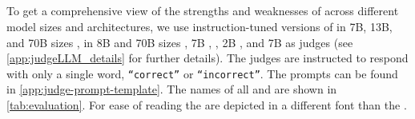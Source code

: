 


 

\subsection{\Judgemodels} \label{sec:experiments:judgellm}
To get a comprehensive view of the strengths and weaknesses of \judgemodels across different model sizes and architectures, we use instruction-tuned versions of  in 7B, 13B, and 70B sizes \citep{touvron2023llama},  in 8B and 70B sizes \citep{meta2024llama3},  7B \citep{jiang2023mistral},  \citep{openai2024gpt4},  2B \citep{gemma2024gemma}, and  7B \citep{judgelm} as judges (see  \cref{app:judgeLLM_details} for further details).
%
The judges are instructed to respond with only a single word,  \texttt{``correct''} or \texttt{``incorrect''}. %
The prompts can be found in \cref{app:judge-prompt-template}. The names of all \evaluatormodels and \judgemodels are shown in \cref{tab:evaluation}.
For ease of reading the \judge{\judgemodels} are depicted in a different font than the \eval{\evaluatormodels}.




